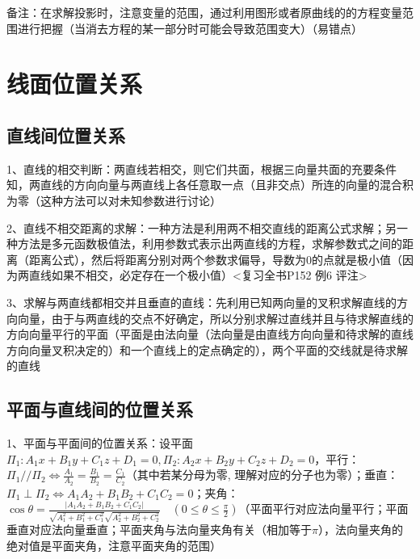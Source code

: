 备注：在求解投影时，注意变量的范围，通过利用图形或者原曲线的的方程变量范围进行把握（当消去方程的某一部分时可能会导致范围变大）（易错点）

\section{线面位置关系}



\subsection{直线间位置关系}

1、直线的相交判断：两直线若相交，则它们共面，根据三向量共面的充要条件知，两直线的方向向量与两直线上各任意取一点（且非交点）所连的向量的混合积为零（这种方法可以对未知参数进行讨论）

2、直线不相交距离的求解：一种方法是利用两不相交直线的距离公式求解；另一种方法是多元函数极值法，利用参数式表示出两直线的方程，求解参数式之间的距离（距离公式），然后将距离分别对两个参数求偏导，导数为0的点就是极小值（因为两直线如果不相交，必定存在一个极小值）<复习全书P152 例6 评注>

3、求解与两直线都相交并且垂直的直线：先利用已知两向量的叉积求解直线的方向向量，由于与两直线的交点不好确定，所以分别求解过直线并且与待求解直线的方向向量平行的平面（平面是由法向量（法向量是由直线方向向量和待求解的直线方向向量叉积决定的）和一个直线上的定点确定的），两个平面的交线就是待求解的直线



\subsection{平面与直线间的位置关系}

1、平面与平面间的位置关系：设平面$\Pi_{1}: A_{1} x+B_{1} y+C_{1} z+D_{1}=0, \Pi_{2}: A_{2} x+B_{2} y+C_{2} z+D_{2}=0$，平行：$\Pi_{1} / / \Pi_{2} \Leftrightarrow \frac{A_{1}}{A_{2}}=\frac{B_{1}}{B_{2}}=\frac{C_{1}}{C_{2}}$（其中若某分母为零, 理解对应的分子也为零）；垂直：$\Pi_{1} \perp \Pi_{2} \Leftrightarrow A_{1} A_{2}+B_{1} B_{2}+C_{1} C_{2}=0$；夹角：$\cos \theta=\frac{\left|A_{1} A_{2}+B_{1} B_{2}+C_{1} C_{2}\right|}{\sqrt{A_{1}^{2}+B_{1}^{2}+C_{1}^{2}} \sqrt{A_{2}^{2}+B_{2}^{2}+C_{2}^{2}}} \quad\left(0 \leqslant \theta \leqslant \frac{\pi}{2}\right)$（平面平行对应法向量平行；平面垂直对应法向量垂直；平面夹角与法向量夹角有关（相加等于$\pi$），法向量夹角的绝对值是平面夹角，注意平面夹角的范围）

